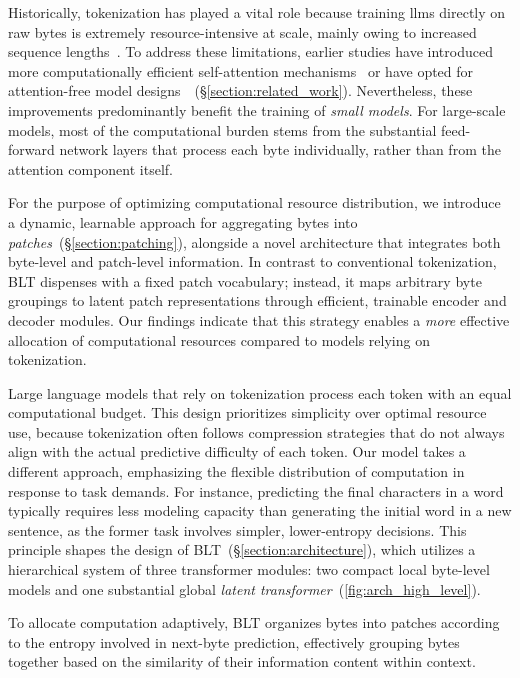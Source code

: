Historically, tokenization has played a vital role because training llms directly on raw bytes is extremely resource-intensive at scale, mainly owing to increased sequence lengths~\citep{xue2022byt5}. To address these limitations, earlier studies have introduced more computationally efficient self-attention mechanisms~\citep{el2020characterbert, clark2022canine} or have opted for attention-free model designs~\citep{wang2024mambabyte}~(\S\ref{section:related_work}). Nevertheless, these improvements predominantly benefit the training of \textit{small models}. For large-scale models, most of the computational burden stems from the substantial feed-forward network layers that process each byte individually, rather than from the attention component itself.

For the purpose of optimizing computational resource distribution, we introduce a dynamic, learnable approach for aggregating bytes into \textit{patches}~(\S\ref{section:patching}), alongside a novel architecture that integrates both byte-level and patch-level information. In contrast to conventional tokenization, {\textsc BLT} dispenses with a fixed patch vocabulary; instead, it maps arbitrary byte groupings to latent patch representations through efficient, trainable encoder and decoder modules. Our findings indicate that this strategy enables a \textit{more} effective allocation of computational resources compared to models relying on tokenization.

Large language models that rely on tokenization process each token with an equal computational budget. This design prioritizes simplicity over optimal resource use, because tokenization often follows compression strategies that do not always align with the actual predictive difficulty of each token. Our model takes a different approach, emphasizing the flexible distribution of computation in response to task demands. For instance, predicting the final characters in a word typically requires less modeling capacity than generating the initial word in a new sentence, as the former task involves simpler, lower-entropy decisions. This principle shapes the design of {\textsc BLT}~(\S\ref{section:architecture}), which utilizes a hierarchical system of three transformer modules: two compact local byte-level models and one substantial global \textit{latent transformer}~(\autoref{fig:arch_high_level}). 

To allocate computation adaptively, {\textsc BLT} organizes bytes into patches according to the entropy involved in next-byte prediction, effectively grouping bytes together based on the similarity of their information content within context.

